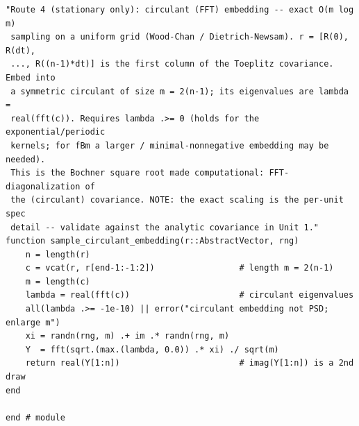 \documentclass[11pt]{article}
\begin{document}
\begin{lstlisting}
"Route 4 (stationary only): circulant (FFT) embedding -- exact O(m log m)
 sampling on a uniform grid (Wood-Chan / Dietrich-Newsam). r = [R(0), R(dt),
 ..., R((n-1)*dt)] is the first column of the Toeplitz covariance. Embed into
 a symmetric circulant of size m = 2(n-1); its eigenvalues are lambda =
 real(fft(c)). Requires lambda .>= 0 (holds for the exponential/periodic
 kernels; for fBm a larger / minimal-nonnegative embedding may be needed).
 This is the Bochner square root made computational: FFT-diagonalization of
 the (circulant) covariance. NOTE: the exact scaling is the per-unit spec
 detail -- validate against the analytic covariance in Unit 1."
function sample_circulant_embedding(r::AbstractVector, rng)
    n = length(r)
    c = vcat(r, r[end-1:-1:2])                 # length m = 2(n-1)
    m = length(c)
    lambda = real(fft(c))                      # circulant eigenvalues
    all(lambda .>= -1e-10) || error("circulant embedding not PSD; enlarge m")
    xi = randn(rng, m) .+ im .* randn(rng, m)
    Y  = fft(sqrt.(max.(lambda, 0.0)) .* xi) ./ sqrt(m)
    return real(Y[1:n])                        # imag(Y[1:n]) is a 2nd draw
end

end # module
\end{lstlisting}
\end{document}
